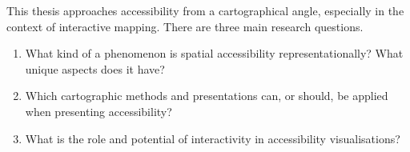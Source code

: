 This thesis approaches accessibility from a cartographical angle,
especially in the context of interactive mapping.
There are three main research questions.
\begin{enumerate}
	\item What kind of a phenomenon is spatial accessibility representationally?
	What unique aspects does it have?
	\item Which cartographic methods and presentations can, or should, 
	be applied when presenting accessibility?
	\item What is the role and potential of interactivity in accessibility visualisations?
\end{enumerate}
